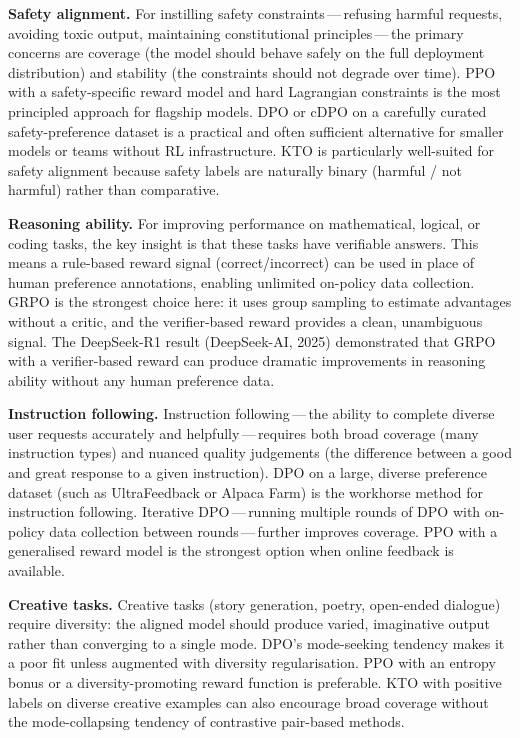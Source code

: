 \textbf{Safety alignment.} For instilling safety constraints\,---\,refusing harmful requests, avoiding toxic output, maintaining constitutional principles\,---\,the primary concerns are coverage (the model should behave safely on the full deployment distribution) and stability (the constraints should not degrade over time). PPO with a safety-specific reward model and hard Lagrangian constraints is the most principled approach for flagship models. DPO or cDPO on a carefully curated safety-preference dataset is a practical and often sufficient alternative for smaller models or teams without RL infrastructure. KTO is particularly well-suited for safety alignment because safety labels are naturally binary (harmful / not harmful) rather than comparative.

\textbf{Reasoning ability.} For improving performance on mathematical, logical, or coding tasks, the key insight is that these tasks have verifiable answers. This means a rule-based reward signal (correct/incorrect) can be used in place of human preference annotations, enabling unlimited on-policy data collection. GRPO is the strongest choice here: it uses group sampling to estimate advantages without a critic, and the verifier-based reward provides a clean, unambiguous signal. The DeepSeek-R1 result (DeepSeek-AI, 2025) demonstrated that GRPO with a verifier-based reward can produce dramatic improvements in reasoning ability without any human preference data.

\textbf{Instruction following.} Instruction following\,---\,the ability to complete diverse user requests accurately and helpfully\,---\,requires both broad coverage (many instruction types) and nuanced quality judgements (the difference between a good and great response to a given instruction). DPO on a large, diverse preference dataset (such as UltraFeedback or Alpaca Farm) is the workhorse method for instruction following. Iterative DPO\,---\,running multiple rounds of DPO with on-policy data collection between rounds\,---\,further improves coverage. PPO with a generalised reward model is the strongest option when online feedback is available.

\textbf{Creative tasks.} Creative tasks (story generation, poetry, open-ended dialogue) require diversity: the aligned model should produce varied, imaginative output rather than converging to a single mode. DPO's mode-seeking tendency makes it a poor fit unless augmented with diversity regularisation. PPO with an entropy bonus or a diversity-promoting reward function is preferable. KTO with positive labels on diverse creative examples can also encourage broad coverage without the mode-collapsing tendency of contrastive pair-based methods.

